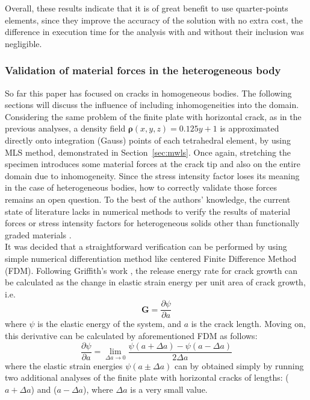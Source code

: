\documentclass[11pt]{acmeArticle}
\numberwithin{equation}{section}
\begin{document}
Overall, these results indicate that it is of great benefit to use quarter-points elements, since they improve the accuracy of the solution with no extra cost, the difference in execution time for the analysis with and without their inclusion was negligible. 
\subsubsection{Validation of material forces in the heterogeneous body}
So far this paper has focused on cracks in homogeneous bodies. 
The following sections will discuss the influence of including inhomogeneities into the domain. 
Considering the same problem of the finite plate with horizontal crack, as in the previous analyses, a density field $\mathbf{\rho}(x,y,z) = 0.125y + 1$ is approximated directly onto integration (Gauss) points of each tetrahedral element, by using MLS method, demonstrated in Section~\ref{sec:mwls}. 
Once again, stretching the specimen introduces some material forces at the crack tip and also on the entire domain due to inhomogeneity. 
Since the stress intensity factor loses its meaning in the case of heterogeneous bodies, how to correctly validate those forces remains an open question. 
To the best of the authors' knowledge, the current state of literature lacks in numerical methods to verify the results of material forces or stress intensity factors for heterogeneous solids other than functionally graded materials \citep{kim2002finite}. \\
It was decided that a straightforward verification can be performed by using simple numerical differentiation method like centered Finite Difference Method (FDM). Following Griffith's work \citep{Griffith163}, the release energy rate for crack growth can be calculated as the change in elastic strain energy per unit area of crack growth, i.e.
\begin{equation}
\mathbf G = \frac{\partial \psi}{\partial a}
\end{equation}
where $\psi$ is the elastic energy of the system, and $a$ is the crack length. Moving on, this derivative can be calculated by aforementioned FDM as follows:
\begin{equation}
 \frac{\partial \psi}{\partial a} = \lim_{\Delta a \to 0} \frac{\psi(a + \Delta a) - \psi(a -\Delta a)}{2\Delta a}
\end{equation}
where the elastic strain energies $\psi(a \pm \Delta a)$ can by obtained simply by running two additional analyses of the finite plate with horizontal cracks of lengths: ($a + \Delta a$) and ($a - \Delta a$), where $\Delta a$ is a very small value. 
\end{document}
